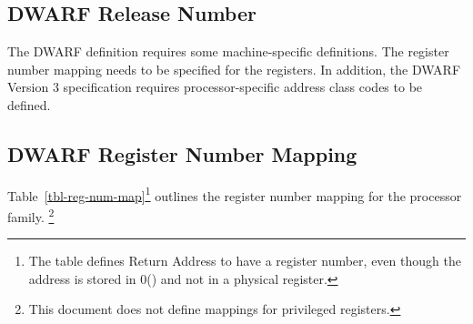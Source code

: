 \subsection{DWARF Release Number}

The DWARF definition requires some machine-specific definitions.
The register number mapping needs to be specified for the \xARCH
registers. In addition, the DWARF Version 3 specification
requires processor-specific address class codes to be defined.

\subsection{DWARF Register Number Mapping}

Table~\ref{tbl-reg-num-map}\footnote{The table defines Return Address
  to have a register number, even though the address is stored in
  0(\ESP) and not in a physical register.}  outlines the register
number mapping for the \xARCH processor family.%
\footnote{This document does not define mappings for privileged registers.}%

